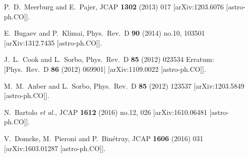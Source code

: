 \begin{thebibliography}{10}
  P.~D.~Meerburg and E.~Pajer,
  JCAP {\bf 1302} (2013) 017
  [arXiv:1203.6076 [astro-ph.CO]].


  E.~Bugaev and P.~Klimai,
  Phys.\ Rev.\ D {\bf 90} (2014) no.10,  103501
  [arXiv:1312.7435 [astro-ph.CO]].


  J.~L.~Cook and L.~Sorbo,
  Phys.\ Rev.\ D {\bf 85} (2012) 023534
   Erratum: [Phys.\ Rev.\ D {\bf 86} (2012) 069901]
  [arXiv:1109.0022 [astro-ph.CO]].


  M.~M.~Anber and L.~Sorbo,
  Phys.\ Rev.\ D {\bf 85} (2012) 123537
  [arXiv:1203.5849 [astro-ph.CO]].


  N.~Bartolo {\it et al.},
  JCAP {\bf 1612} (2016) no.12,  026
  [arXiv:1610.06481 [astro-ph.CO]].


  V.~Domcke, M.~Pieroni and P.~Binétruy,
  JCAP {\bf 1606} (2016) 031
  [arXiv:1603.01287 [astro-ph.CO]].



\end{thebibliography}
